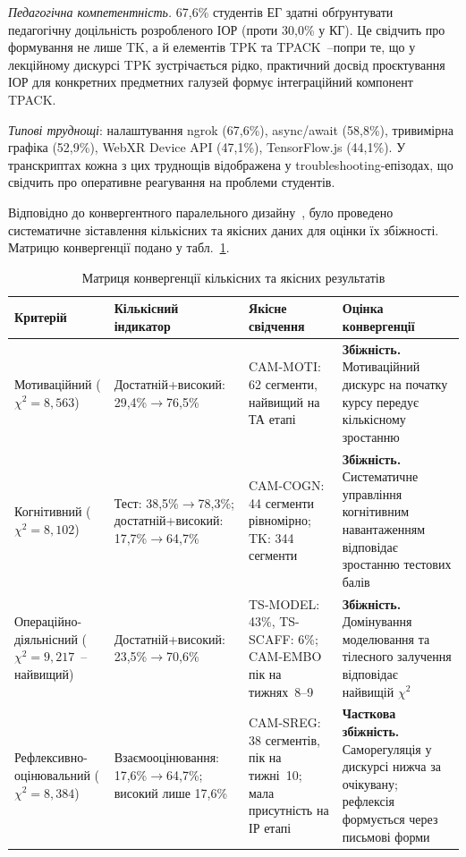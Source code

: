 \textit{Педагогічна компетентність.} 67,6\% студентів ЕГ здатні обґрунтувати педагогічну доцільність розробленого ІОР (проти 30,0\% у КГ). Це свідчить про формування не лише TK, а й елементів TPK та TPACK~--попри те, що у лекційному дискурсі TPK зустрічається рідко, практичний досвід проєктування ІОР для конкретних предметних галузей формує інтеграційний компонент TPACK.

\textit{Типові труднощі}: налаштування ngrok (67,6\%), async/await (58,8\%), тривимірна графіка (52,9\%), WebXR Device API (47,1\%), TensorFlow.js (44,1\%). У транскриптах кожна з цих труднощів відображена у troubleshooting-епізодах, що свідчить про оперативне реагування на проблеми студентів.


Відповідно до конвергентного паралельного дизайну~\cite{Creswell2018MixedMethods}, було проведено систематичне зіставлення кількісних та якісних даних для оцінки їх збіжності. Матрицю конвергенції подано у табл.~\ref{tab:convergence}.

\begin{table}[!h]
\centering
\caption{Матриця конвергенції кількісних та якісних результатів}
\label{tab:convergence}
\small
\begin{tabular}{|p{2.5cm}|p{3cm}|p{3.5cm}|p{4.5cm}|}
\hline
\textbf{Критерій} & \textbf{Кількісний індикатор} & \textbf{Якісне свідчення} & \textbf{Оцінка конвергенції} \\
\hline
Мотиваційний ($\chi^2=8{,}563$) &
Достатній+високий: 29,4\%$\to$76,5\% &
CAM-MOTI: 62 сегменти, найвищий на ТА етапі &
\textbf{Збіжність.} Мотиваційний дискурс на початку курсу передує кількісному зростанню \\
\hline
Когнітивний ($\chi^2=8{,}102$) &
Тест: 38,5\%$\to$78,3\%; достатній+високий: 17,7\%$\to$64,7\% &
CAM-COGN: 44 сегменти рівномірно; TK: 344 сегменти &
\textbf{Збіжність.} Систематичне управління когнітивним навантаженням відповідає зростанню тестових балів \\
\hline
Операційно-діяльнісний ($\chi^2=9{,}217$~--найвищий) &
Достатній+високий: 23,5\%$\to$70,6\% &
TS-MODEL: 43\%, TS-SCAFF: 6\%; CAM-EMBO пік на тижнях~8--9 &
\textbf{Збіжність.} Домінування моделювання та тілесного залучення відповідає найвищій $\chi^2$ \\
\hline
Рефлексивно-оцінювальний ($\chi^2=8{,}384$) &
Взаємооцінювання: 17,6\%$\to$64,7\%; високий лише 17,6\% &
CAM-SREG: 38 сегментів, пік на тижні~10; мала присутність на ІР етапі &
\textbf{Часткова збіжність.} Саморегуляція у дискурсі нижча за очікувану; рефлексія формується через письмові форми \\
\hline
\end{tabular}
\end{table}

